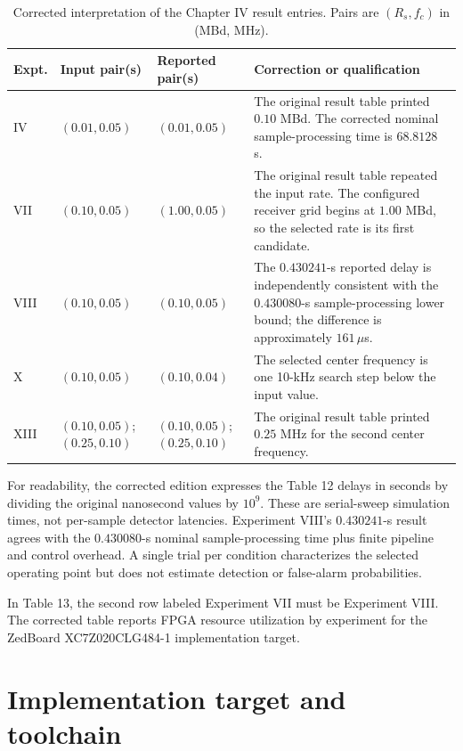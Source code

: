 \documentclass[12pt]{article}
\begin{document}
\begin{table}[H]
\centering
\singlespacing
\caption{Corrected interpretation of the Chapter IV result entries. Pairs are $(R_s,f_c)$ in (MBd, MHz).}
\small
\setlength{\tabcolsep}{4pt}
\begin{tabularx}{\textwidth}{@{}L{0.55in}L{1.20in}L{1.25in}Y@{}}
\toprule
\textbf{Expt.} & \textbf{Input pair(s)} & \textbf{Reported pair(s)} & \textbf{Correction or qualification} \\
\midrule
IV & $(0.01,0.05)$ & $(0.01,0.05)$ & The original result table printed $0.10$ MBd. The corrected nominal sample-processing time is $68.8128$ s. \\
VII & $(0.10,0.05)$ & $(1.00,0.05)$ & The original result table repeated the input rate. The configured receiver grid begins at $1.00$ MBd, so the selected rate is its first candidate. \\
VIII & $(0.10,0.05)$ & $(0.10,0.05)$ & The $0.430241$-s reported delay is independently consistent with the $0.430080$-s sample-processing lower bound; the difference is approximately $161\,\mu$s. \\
X & $(0.10,0.05)$ & $(0.10,0.04)$ & The selected center frequency is one 10-kHz search step below the input value. \\
XIII & $(0.10,0.05)$; $(0.25,0.10)$ & $(0.10,0.05)$; $(0.25,0.10)$ & The original result table printed $0.25$ MHz for the second center frequency. \\
\bottomrule
\end{tabularx}
\end{table}

For readability, the corrected edition expresses the Table 12 delays in seconds by dividing the original nanosecond values by $10^9$. These are serial-sweep simulation times, not per-sample detector latencies. Experiment VIII's $0.430241$-s result agrees with the $0.430080$-s nominal sample-processing time plus finite pipeline and control overhead. A single trial per condition characterizes the selected operating point but does not estimate detection or false-alarm probabilities.

In Table 13, the second row labeled Experiment VII must be Experiment VIII. The corrected table reports FPGA resource utilization by experiment for the ZedBoard XC7Z020CLG484-1 implementation target.

\section{Implementation target and toolchain}
\end{document}
